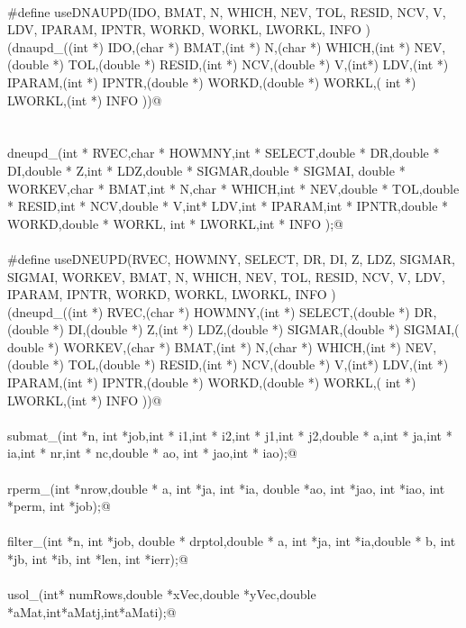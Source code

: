 \documentclass[12pt]{article}
\begin{document}
\begin{flushleft}
\begin{minipage}{\linewidth}
\begin{list}{}{}
\mbox{}\verb@@\\
\mbox{}\verb@#define useDNAUPD(IDO,  BMAT,  N, WHICH, NEV, TOL, RESID, NCV, V, LDV, IPARAM, IPNTR, WORKD, WORKL,  LWORKL, INFO )\@\\
\mbox{}\verb@(dnaupd_((int *) IDO,(char *)  BMAT,(int *)  N,(char *) WHICH,(int *) NEV,(double *) TOL,(double *) RESID,(int *) NCV,(double *) V,(int*) LDV,(int *) IPARAM,(int *) IPNTR,(double *) WORKD,(double *) WORKL,( int *)  LWORKL,(int *) INFO ))@\\
\mbox{}\verb@@\\
\mbox{}\verb@@\\
\mbox{}\verb@void dneupd_(int * RVEC,char * HOWMNY,int * SELECT,double * DR,double * DI,double * Z,int * LDZ,double * SIGMAR,double * SIGMAI, double * WORKEV,char *  BMAT,int *  N,char * WHICH,int * NEV,double * TOL,double * RESID,int * NCV,double * V,int* LDV,int * IPARAM,int * IPNTR,double * WORKD,double * WORKL, int *  LWORKL,int * INFO );@\\
\mbox{}\verb@@\\
\mbox{}\verb@#define useDNEUPD(RVEC, HOWMNY, SELECT, DR, DI, Z, LDZ, SIGMAR, SIGMAI, WORKEV,  BMAT,  N, WHICH, NEV, TOL, RESID, NCV, V, LDV, IPARAM, IPNTR, WORKD, WORKL,  LWORKL, INFO )\@\\
\mbox{}\verb@(dneupd_((int *) RVEC,(char *) HOWMNY,(int *) SELECT,(double *) DR,(double *) DI,(double *) Z,(int *) LDZ,(double *) SIGMAR,(double *) SIGMAI,( double *) WORKEV,(char *)  BMAT,(int *)  N,(char *) WHICH,(int *) NEV,(double *) TOL,(double *) RESID,(int *) NCV,(double *) V,(int*) LDV,(int *) IPARAM,(int *) IPNTR,(double *) WORKD,(double *) WORKL,( int *)  LWORKL,(int *) INFO ))@\\
\mbox{}\verb@@\\
\mbox{}\verb@int submat_(int *n, int *job,int * i1,int * i2,int * j1,int * j2,double * a,int * ja,int * ia,int * nr,int * nc,double * ao, int *      jao,int * iao);@\\
\mbox{}\verb@@\\
\mbox{}\verb@int rperm_(int *nrow,double * a, int *ja, int *ia, double *ao, int *jao, int *iao, int *perm, int *job);@\\
\mbox{}\verb@@\\
\mbox{}\verb@int filter_(int *n, int *job, double * drptol,double * a, int *ja, int *ia,double * b, int *jb, int *ib, int *len, int *ierr);@\\
\mbox{}\verb@@\\
\mbox{}\verb@int usol_(int* numRows,double *xVec,double *yVec,double *aMat,int*aMatj,int*aMati);@\\

\end{list}
\end{minipage}
\end{flushleft}
\end{document}
